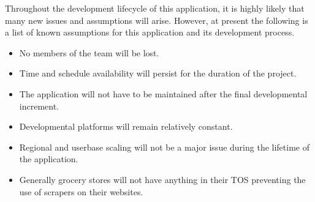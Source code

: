 %
%
%
%
Throughout the development lifecycle of this application, it is highly likely that many new issues and assumptions will arise.  
However, at present the following is a list of known assumptions for this application and its development process.

\begin{itemize}
  \item No members of the team will be lost.
  \item Time and schedule availability will persist for the duration of the project.
  \item The application will not have to be maintained after the final developmental increment.
  \item Developmental platforms will remain relatively constant.
  \item Regional and userbase scaling will not be a major issue during the lifetime of the application.
  \item Generally grocery stores will not have anything in their TOS preventing the use of scrapers on their websites.
\end{itemize}